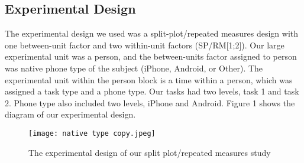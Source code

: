\documentclass[conference]{IEEEtran}
\begin{document}
\subsection{Experimental Design}
The experimental design we used was a split-plot/repeated measures design with one between-unit factor and two within-unit factors (SP/RM[1;2]). Our large experimental unit was a person, and the between-units factor assigned to person was native phone type of the subject (iPhone, Android, or Other). The experimental unit within the person block is a time within a person, which was assigned a task type and a phone type. Our tasks had two levels, task 1 and task 2. Phone type also included two levels, iPhone and Android. Figure 1 shows the diagram of our experimental design. 
\begin{figure}
    \centering
    \texttt{[image: native type copy.jpeg]}
    \caption{The experimental design of our split plot/repeated measures study}
    \label{fig:fig1}
\end{figure}
\end{document}
